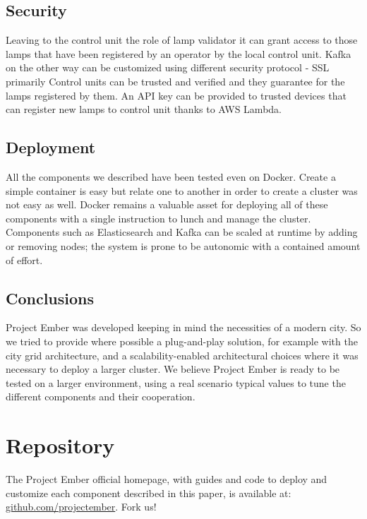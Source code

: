 \subsection{Security}
Leaving to the control unit the role of lamp validator it can grant access to those lamps that have been registered by an operator by the local control unit. Kafka on the other way can be customized using different security protocol - SSL primarily Control units can be trusted and verified and they guarantee for the lamps registered by them. An API key can be provided to trusted devices that can register new lamps to control unit thanks to AWS Lambda. 

\subsection{Deployment}
All the components we described have been tested even on Docker. Create a simple container is easy but relate one to another in order to create a cluster was not easy as well. Docker remains a valuable asset for deploying all of these components with a single instruction to lunch and manage the cluster. Components such as Elasticsearch and Kafka can be scaled at runtime by adding or removing nodes; the system is prone to be autonomic with a contained amount of effort.

\subsection{Conclusions}
Project Ember was developed keeping in mind the necessities of a modern city. So we tried to provide where possible a plug-and-play solution, for example with the city grid architecture, and a scalability-enabled architectural choices where it was necessary to deploy a larger cluster. We believe Project Ember is ready to be tested on a larger environment, using a real scenario typical values to tune the different components and their cooperation. 

\section*{Repository}
The Project Ember official homepage, with guides and code to deploy and customize each component described in this paper, is available at: \href{https://github.com/projectember}{github.com/projectember}. Fork us!

